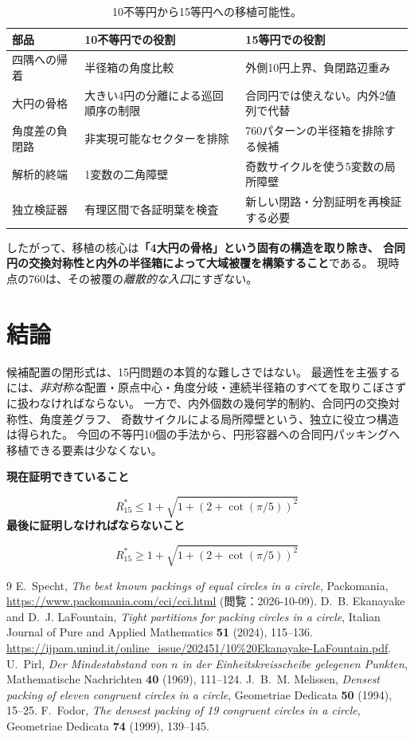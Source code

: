 \documentclass[11pt,a4paper]{article}
\theoremstyle{JPthm}
\theoremstyle{definition}
\newcommand{\Rstar}{R_{15}^{*}}
\begin{document}
\begin{table}[H]\centering
\caption{10不等円から15等円への移植可能性。}
\begin{tabularx}{\linewidth}{@{}p{.28\linewidth}X X@{}}
\toprule
部品 & 10不等円での役割 & 15等円での役割\\
\midrule
四隅への帰着 & 半径箱の角度比較 & 外側10円上界、負閉路辺重み\\
大円の骨格 & 大きい4円の分離による巡回順序の制限 & 合同円では使えない。内外2値列で代替\\
角度差の負閉路 & 非実現可能なセクターを排除 & 760パターンの半径箱を排除する候補\\
解析的終端 & 1変数の二角障壁 & 奇数サイクルを使う5変数の局所障壁\\
独立検証器 & 有理区間で各証明葉を検査 & 新しい閉路・分割証明を再検証する必要\\
\bottomrule
\end{tabularx}
\end{table}

したがって、移植の核心は\textbf{「4大円の骨格」という固有の構造を取り除き、
合同円の交換対称性と内外の半径箱によって大域被覆を構築すること}である。
現時点の760は、その被覆の\emph{離散的な入口}にすぎない。

\section{結論}
候補配置の閉形式は、15円問題の本質的な難しさではない。
最適性を主張するには、\emph{非対称な}配置・原点中心・角度分岐・連続半径箱のすべてを取りこぼさずに扱わなければならない。
一方で、内外個数の幾何学的制約、合同円の交換対称性、角度差グラフ、
奇数サイクルによる局所障壁という、独立に役立つ構造は得られた。
今回の不等円10個の手法から、円形容器への合同円パッキングへ移植できる要素は少なくない。

\begin{keybox}
\centering
\textbf{現在証明できていること}\par
\[
 \boxed{\Rstar\le
 1+\sqrt{1+(2+\cot(\pi/5))^2}}
\]
\textbf{最後に証明しなければならないこと}\par
\[
 \boxed{\Rstar\ge
 1+\sqrt{1+(2+\cot(\pi/5))^2}}
\]
\end{keybox}

\begin{thebibliography}{9}
E.~Specht, \emph{The best known packings of equal circles in a circle}, Packomania,
\url{https://www.packomania.com/cci/cci.html} (閲覧：2026-10-09).
D.~B. Ekanayake and D.~J. LaFountain,
\emph{Tight partitions for packing circles in a circle},
Italian Journal of Pure and Applied Mathematics \textbf{51} (2024), 115--136.
\url{https://ijpam.uniud.it/online_issue/202451/10%20Ekanayake-LaFountain.pdf}.
U.~Pirl, \emph{Der Mindestabstand von $n$ in der Einheitskreisscheibe gelegenen Punkten},
Mathematische Nachrichten \textbf{40} (1969), 111--124.
J.~B.~M. Melissen, \emph{Densest packing of eleven congruent circles in a circle},
Geometriae Dedicata \textbf{50} (1994), 15--25.
F.~Fodor, \emph{The densest packing of 19 congruent circles in a circle},
Geometriae Dedicata \textbf{74} (1999), 139--145.
\end{thebibliography}
\end{document}
